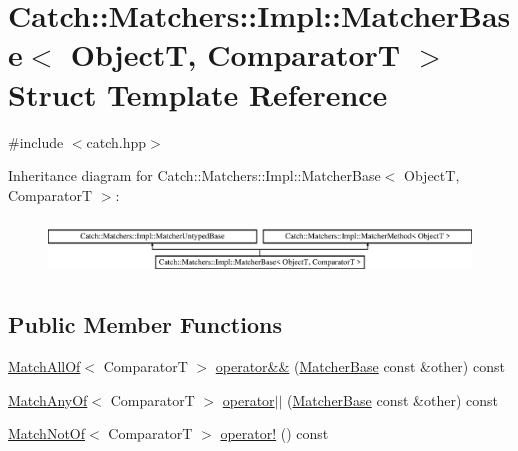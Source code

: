 \hypertarget{structCatch_1_1Matchers_1_1Impl_1_1MatcherBase}{\section{Catch\-:\-:Matchers\-:\-:Impl\-:\-:Matcher\-Base$<$ Object\-T, Comparator\-T $>$ Struct Template Reference}
\label{structCatch_1_1Matchers_1_1Impl_1_1MatcherBase}
}


{\ttfamily \#include $<$catch.\-hpp$>$}

Inheritance diagram for Catch\-:\-:Matchers\-:\-:Impl\-:\-:Matcher\-Base$<$ Object\-T, Comparator\-T $>$\-:\begin{figure}[H]
\begin{center}
\leavevmode
\includegraphics[height=1.509434cm]{structCatch_1_1Matchers_1_1Impl_1_1MatcherBase}
\end{center}
\end{figure}
\subsection*{Public Member Functions}
\begin{DoxyCompactItemize}
\item 
\hyperlink{structCatch_1_1Matchers_1_1Impl_1_1MatchAllOf}{Match\-All\-Of}$<$ Comparator\-T $>$ \hyperlink{structCatch_1_1Matchers_1_1Impl_1_1MatcherBase_a0a81a1cf1955daf438fba5607e036e56}{operator\&\&} (\hyperlink{structCatch_1_1Matchers_1_1Impl_1_1MatcherBase}{Matcher\-Base} const \&other) const 
\item 
\hyperlink{structCatch_1_1Matchers_1_1Impl_1_1MatchAnyOf}{Match\-Any\-Of}$<$ Comparator\-T $>$ \hyperlink{structCatch_1_1Matchers_1_1Impl_1_1MatcherBase_a5241c16329b71ce181c3f3fd599d6e06}{operator$\vert$$\vert$} (\hyperlink{structCatch_1_1Matchers_1_1Impl_1_1MatcherBase}{Matcher\-Base} const \&other) const 
\item 
\hyperlink{structCatch_1_1Matchers_1_1Impl_1_1MatchNotOf}{Match\-Not\-Of}$<$ Comparator\-T $>$ \hyperlink{structCatch_1_1Matchers_1_1Impl_1_1MatcherBase_a1c40d784bc484b968bdda10b076709c2}{operator!} () const 
\end{DoxyCompactItemize}
